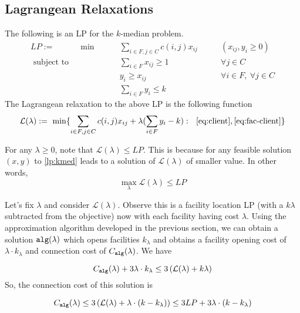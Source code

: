 \documentclass[11pt]{article}
\def\alg{{\tt alg}}
\begin{document}
\subsection*{Lagrangean Relaxations}
\def\L{{\mathcal L}}
The following is an LP for the $k$-median problem.
\begin{align}
LP := ~~~~~~~~~~~~~ \min & \qquad \sum_{i\in F,j\in C} c(i,j)x_{ij} & \qquad (x_{ij},y_i \ge 0) \label{lp:kmed} \\
\mbox{ subject to } & \qquad \sum_{i\in F} x_{ij} \ge 1 & \qquad \forall j\in C \label{eq:client} \\
			     & \qquad y_i \ge x_{ij} & \qquad \forall i\in F,~\forall j\in C \label{eq:fac-client}	 \\
			     & \qquad \sum_{i\in F} y_i \le k \label{eq:k-fac}
\end{align}
The Lagrangean relaxation to the above LP is the following function
$$\L(\lambda) :=~ \min\{ \sum_{i\in F,j\in C} c(i,j)x_{ij} + \lambda(\sum_{i\in F} y_i - k):~~ \eqref{eq:client}, \eqref{eq:fac-client}\}$$

For any $\lambda \ge 0$, note that $\L(\lambda) \le LP$. This is because for any feasible solution $(x,y)$ 
to \eqref{lp:kmed} leads to a solution of $\L(\lambda)$ of smaller value. In other words, $$\max_{\lambda} \L(\lambda) \le LP$$

\noindent
Let's fix $\lambda$ and consider $\L(\lambda)$. Observe this is a facility location LP (with a $k\lambda$ subtracted from the objective) now with each facility having cost $\lambda$. Using the approximation algorithm developed in the previous section, we can obtain a solution $\alg(\lambda)$ which opens facilities $k_\lambda$ and obtains a facility opening cost 
of $\lambda\cdot k_\lambda$ and connection cost of $C_{\alg}(\lambda)$. We have 

$$C_{\alg}(\lambda) + 3\lambda\cdot k_\lambda \le 3\left(\L(\lambda) + k\lambda\right)$$
\noindent
So, the connection cost of this solution is 

$$C_{\alg}(\lambda) \le 3\left(\L(\lambda) + \lambda\cdot (k - k_\lambda) \right) \le 3LP + 3\lambda\cdot(k-k_\lambda)$$
\end{document}
